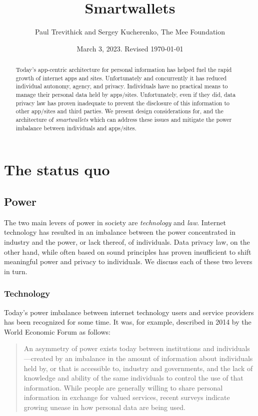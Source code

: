 \documentclass[11pt, oneside]{article}   	%
\title{Smartwallets}
\author{Paul Trevithick and Sergey Kucherenko, The Mee Foundation}
\date{March 3, 2023. Revised \today}
\begin{document}
\maketitle
\begin{abstract}
Today's app-centric architecture for personal information has helped fuel the rapid growth of internet apps and sites. Unfortunately and concurrently it has reduced individual autonomy, agency, and privacy. Individuals have no practical means to manage their personal data held by apps/sites. Unfortunately, even if they did, data privacy law has proven inadequate to prevent the disclosure of this information to other app/sites and third parties. We present design considerations for, and the architecture of \emph{smartwallets} which can address these issues and mitigate the power imbalance between individuals and apps/sites.
\end{abstract}


\section{The status quo} %

\subsection{Power}

The two main levers of power in society are \emph{technology} and \emph{law}. Internet technology has resulted in an imbalance between the power concentrated in industry and the power, or lack thereof, of individuals. Data privacy law, on the other hand, while often based on sound principles has proven insufficient to shift meaningful power and privacy to individuals. We discuss each of these two levers in turn.

\subsubsection{Technology}

Today's power imbalance between internet technology users and service providers has been recognized for some time. It was, for example, described in 2014 by the World Economic Forum\cite{Hoffman2014} as follows:
\begin{quote}
	An asymmetry of power exists today between institutions and individuals---created by an imbalance in the amount of information about individuals held by, or that is accessible to, industry and governments, and the lack of knowledge and ability of the same individuals to control the use of that information. While people are generally willing to share personal information in exchange for valued services, recent surveys indicate growing unease in how personal data are being used.
\end{quote}
\end{document}

